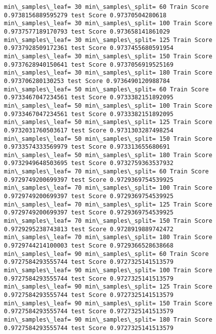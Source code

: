 \documentclass[11pt]{article}
\begin{document}
    \begin{Verbatim}[commandchars=\\\{\}]
min\_samples\_leaf= 30 min\_samples\_split= 60 Train Score 0.9738156889595279 test Score 0.97370504280618
min\_samples\_leaf= 30 min\_samples\_split= 100 Train Score 0.9737577189170793 test Score 0.973658141861029
min\_samples\_leaf= 30 min\_samples\_split= 125 Train Score 0.9737928509172361 test Score 0.9737455680591954
min\_samples\_leaf= 30 min\_samples\_split= 150 Train Score 0.9737628940150641 test Score 0.9737056919525169
min\_samples\_leaf= 30 min\_samples\_split= 180 Train Score 0.973706280130253 test Score 0.9736490120988784
min\_samples\_leaf= 50 min\_samples\_split= 60 Train Score 0.9733467047234561 test Score 0.9733382151892095
min\_samples\_leaf= 50 min\_samples\_split= 100 Train Score 0.9733467047234561 test Score 0.9733382151892095
min\_samples\_leaf= 50 min\_samples\_split= 125 Train Score 0.9732031760503617 test Score 0.9731303287498254
min\_samples\_leaf= 50 min\_samples\_split= 150 Train Score 0.9733574333569979 test Score 0.973313655680691
min\_samples\_leaf= 50 min\_samples\_split= 180 Train Score 0.9732949648503695 test Score 0.9732759363537932
min\_samples\_leaf= 70 min\_samples\_split= 60 Train Score 0.9729749200699397 test Score 0.9729369754539925
min\_samples\_leaf= 70 min\_samples\_split= 100 Train Score 0.9729749200699397 test Score 0.9729369754539925
min\_samples\_leaf= 70 min\_samples\_split= 125 Train Score 0.9729749200699397 test Score 0.9729369754539925
min\_samples\_leaf= 70 min\_samples\_split= 150 Train Score 0.9729295238743813 test Score 0.9728919889742472
min\_samples\_leaf= 70 min\_samples\_split= 180 Train Score 0.9729744214100003 test Score 0.9729366528638668
min\_samples\_leaf= 90 min\_samples\_split= 60 Train Score 0.9727584293555744 test Score 0.9727325141513579
min\_samples\_leaf= 90 min\_samples\_split= 100 Train Score 0.9727584293555744 test Score 0.9727325141513579
min\_samples\_leaf= 90 min\_samples\_split= 125 Train Score 0.9727584293555744 test Score 0.9727325141513579
min\_samples\_leaf= 90 min\_samples\_split= 150 Train Score 0.9727584293555744 test Score 0.9727325141513579
min\_samples\_leaf= 90 min\_samples\_split= 180 Train Score 0.9727584293555744 test Score 0.9727325141513579

    \end{Verbatim}
\end{document}
